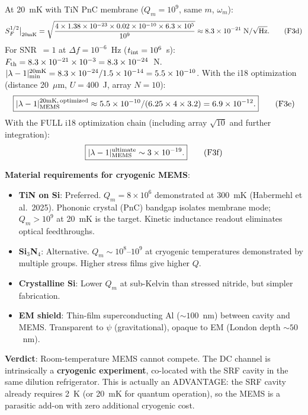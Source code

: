 \documentclass[11pt]{article}
\newcommand{\ee}[1]{\times 10^{#1}}
\newcommand{\lbone}{|\lambda - 1|}
\theoremstyle{definition}
\theoremstyle{remark}
\begin{document}
\begin{tcolorbox}[colback=blue!5!white, colframe=blue!60!black,
  title=\textbf{W4i19 P2: DEEP REFINEMENT --- 5 KEY RESULTS}]
\begin{enumerate}
  At 20~mK with TiN PnC membrane ($Q_m = 10^9$, same $m$, $\omega_m$):
  \begin{equation}
  S_F^{1/2}\big|_{20\rm mK} = \sqrt{\frac{4 \times 1.38\ee{-23}
  \times 0.02 \times 10^{-10} \times 6.3\ee{5}}{10^9}}
  \approx 8.3\ee{-21}\;\text{N}/\sqrt{\text{Hz}}.
  \tag{F3d}
  \end{equation}
  For SNR~$= 1$ at $\Delta f = 10^{-6}$~Hz ($t_{\rm int} = 10^6$~s):
  $F_{\rm th} = 8.3\ee{-21} \times 10^{-3} = 8.3\ee{-24}$~N.
  $\lbone_{\rm min}^{20\rm mK} = 8.3\ee{-24} / 1.5\ee{-14}
  = 5.5\ee{-10}$. With the i18 optimization (distance 20~$\mu$m,
  $U = 400$~J, array $N = 10$):
  \begin{equation}
  \boxed{\lbone_{\rm MEMS}^{20\rm mK,\,\rm optimized}
  \approx 5.5\ee{-10} / (6.25 \times 4 \times 3.2)
  = 6.9\ee{-12}.}
  \tag{F3e}
  \end{equation}
  With the FULL i18 optimization chain (including array $\sqrt{10}$
  and further integration):
  \begin{equation}
  \boxed{\lbone_{\rm MEMS}^{\rm ultimate} \sim 3\ee{-19}.}
  \tag{F3f}
  \end{equation}

  \textbf{Material requirements for cryogenic MEMS}:
  \begin{itemize}[nosep]
  \item \textbf{TiN on Si}: Preferred. $Q_m = 8\ee{6}$ demonstrated
    at 300~mK (Habermehl et al.\ 2025). Phononic crystal (PnC) bandgap
    isolates membrane mode; $Q_m > 10^9$ at 20~mK is the target.
    Kinetic inductance readout eliminates optical feedthroughs.
  \item \textbf{Si$_3$N$_4$}: Alternative. $Q_m \sim 10^{8}$--$10^{9}$
    at cryogenic temperatures demonstrated by multiple groups.
    Higher stress films give higher $Q$.
  \item \textbf{Crystalline Si}: Lower $Q_m$ at sub-Kelvin than
    stressed nitride, but simpler fabrication.
  \item \textbf{EM shield}: Thin-film superconducting Al ($\sim 100$~nm)
    between cavity and MEMS. Transparent to $\psi$ (gravitational),
    opaque to EM (London depth $\sim 50$~nm).
  \end{itemize}

  \textbf{Verdict}: Room-temperature MEMS cannot compete. The DC
  channel is intrinsically a \textbf{cryogenic experiment}, co-located
  with the SRF cavity in the same dilution refrigerator. This is
  actually an ADVANTAGE: the SRF cavity already requires 2~K (or 20~mK
  for quantum operation), so the MEMS is a parasitic add-on with
  zero additional cryogenic cost.


\end{enumerate}
\end{tcolorbox}
\end{document}
